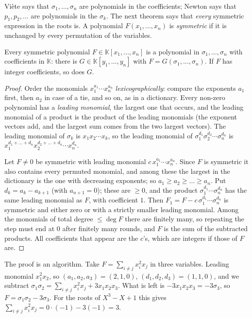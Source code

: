Vi\`ete says that $\sigma_1,\dots,\sigma_n$ are polynomials in the coefficients; Newton says that $p_1,p_2,\dots$ are polynomials in the $\sigma_k$.
The next theorem says that \emph{every} symmetric expression in the roots is. A polynomial $F(x_1,\dots,x_n)$ is \emph{symmetric} if it is unchanged by
every permutation of the variables.

\begin{theorem}\label{thm:symmetric}
Every symmetric polynomial $F\in\mathbb K[x_1,\dots,x_n]$ is a polynomial in $\sigma_1,\dots,\sigma_n$ with coefficients in $\mathbb K$: there is
$G\in\mathbb K[y_1,\dots,y_n]$ with $F=G(\sigma_1,\dots,\sigma_n)$. If $F$ has integer coefficients, so does $G$.
\end{theorem}
\begin{proof}
Order the monomials $x_1^{a_1}\cdots x_n^{a_n}$ \emph{lexicographically}: compare the exponents $a_1$ first, then $a_2$ in case of a tie, and so on,
as in a dictionary. Every non-zero polynomial has a \emph{leading monomial}, the largest one that occurs, and the leading monomial of a product is
the product of the leading monomials (the exponent vectors add, and the largest sum comes from the two largest vectors). The leading monomial of
$\sigma_k$ is $x_1x_2\cdots x_k$, so the leading monomial of $\sigma_1^{d_1}\sigma_2^{d_2}\cdots\sigma_n^{d_n}$ is
$x_1^{d_1+\dots+d_n}x_2^{d_2+\dots+d_n}\cdots x_n^{d_n}$.

Let $F\ne0$ be symmetric with leading monomial $c\,x_1^{a_1}\cdots x_n^{a_n}$. Since $F$ is symmetric it also contains every permuted monomial, and
among these the largest in the dictionary is the one with decreasing exponents; so $a_1\ge a_2\ge\dots\ge a_n$. Put $d_k=a_k-a_{k+1}$ (with
$a_{n+1}=0$); these are $\ge0$, and the product $\sigma_1^{d_1}\cdots\sigma_n^{d_n}$ has the same leading monomial as $F$, with coefficient $1$. Then
$F_1=F-c\,\sigma_1^{d_1}\cdots\sigma_n^{d_n}$ is symmetric and either zero or with a strictly smaller leading monomial. Among the monomials of total
degree $\le\deg F$ there are finitely many, so repeating the step must end at $0$ after finitely many rounds, and $F$ is the sum of the
subtracted products. All coefficients that appear are the $c$'s, which are integers if those of $F$ are.
\end{proof}

\begin{examplex}
The proof is an algorithm. Take $F=\sum_{i\ne j}x_i^2x_j$ in three variables. Leading monomial $x_1^2x_2$, so $(a_1,a_2,a_3)=(2,1,0)$,
$(d_1,d_2,d_3)=(1,1,0)$, and we subtract $\sigma_1\sigma_2=\sum_{i\ne j}x_i^2x_j+3x_1x_2x_3$. What is left is $-3x_1x_2x_3=-3\sigma_3$, so
$F=\sigma_1\sigma_2-3\sigma_3$. For the roots of $X^3-X+1$ this gives $\sum_{i\ne j}x_i^2x_j=0\cdot(-1)-3(-1)=3$.
\end{examplex}

